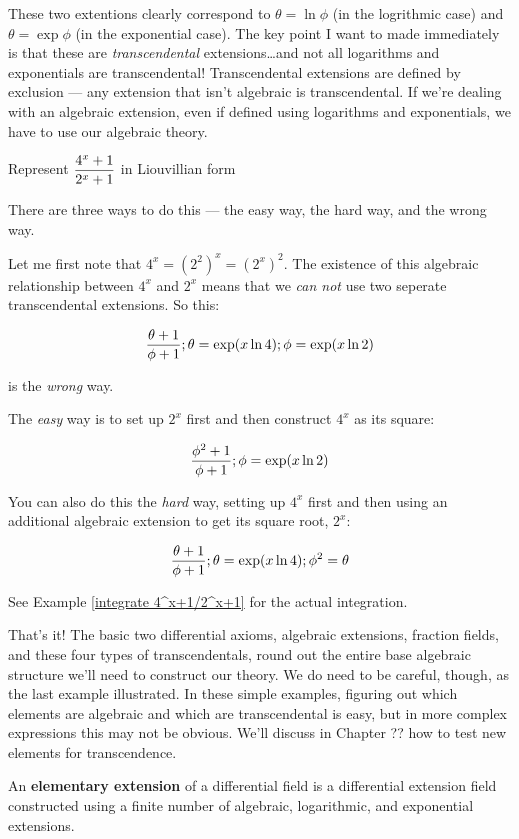 These two extentions clearly correspond to $\theta = \ln\phi$ (in the
logrithmic case) and $\theta = \exp\phi$ (in the exponential case).
The key point I want to made immediately is that these are {\it
transcendental} extensions\ldots and not all logarithms and
exponentials are transcendental!  Transcendental extensions are
defined by exclusion --- any extension that isn't algebraic is
transcendental.  If we're dealing with an algebraic extension, even if
defined using logarithms and exponentials, we have to use our
algebraic theory.

\example Represent $\displaystyle {{4^x+1}\over{2^x+1}}$ in Liouvillian form\label{represent 4^x+1/2^x+1}

There are three ways to do this --- the easy way, the hard way, and
the wrong way.

Let me first note that $4^x = (2^2)^x = (2^x)^2$.  The existence of
this algebraic relationship between $4^x$ and $2^x$ means that we {\it
can not} use two seperate transcendental extensions.  So this:

$${{\theta+1}\over{\phi+1}}; \theta = \exp(x \ln 4); \phi = \exp(x \ln 2)$$

is the {\it wrong} way.

The {\it easy} way is to set up $2^x$ first and then construct $4^x$
as its square:

$${{\phi^2+1}\over{\phi+1}}; \phi = \exp(x \ln 2)$$

You can also do this the {\it hard} way, setting up $4^x$ first and
then using an additional algebraic extension to get its square root,
$2^x$:

$${{\theta+1}\over{\phi+1}}; \theta = \exp(x \ln 4); \phi^2 = \theta$$

See Example \ref{integrate 4^x+1/2^x+1} for the actual integration.

\endexample

That's it!  The basic two differential axioms, algebraic extensions,
fraction fields, and these four types of transcendentals, round out
the entire base algebraic structure we'll need to construct our
theory.  We do need to be careful, though, as the last example
illustrated.  In these simple examples, figuring out which elements
are algebraic and which are transcendental is easy, but in more
complex expressions this may not be obvious.  We'll discuss in Chapter
?? how to test new elements for transcendence.


An {\bf elementary extension} of a differential field
is a differential extension field constructed using
a finite number of algebraic, logarithmic, and
exponential extensions.

